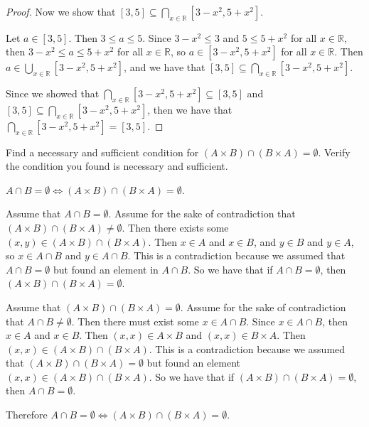 \documentclass[12 pt]{exam}
\begin{document}
\begin{questions}
\begin{solution}
\begin{proof}
    Now we show that $[3, 5] \subseteq \bigcap_{x \in \mathbb{R}} [3-x^2, 5+x^2]$.

    Let $a \in [3, 5]$. Then $3 \le a \le 5$. Since $3-x^2 \le 3$ and $5 \le 5+x^2$ for all
    $x \in \mathbb{R}$, then $3-x^2 \le a \le 5+x^2$ for all $x \in \mathbb{R}$, so
    $a \in [3-x^2, 5+x^2]$ for all $x \in \mathbb{R}$. Then $a \in \bigcup_{x \in \mathbb{R}} [3-x^2, 5+x^2]$,
    and we have that $[3, 5] \subseteq \bigcap_{x \in \mathbb{R}} [3-x^2, 5+x^2]$.

    Since we showed that $\bigcap_{x \in \mathbb{R}} [3-x^2, 5+x^2 ] \subseteq [3,5]$
    and $[3, 5] \subseteq \bigcap_{x \in \mathbb{R}} [3-x^2, 5+x^2]$, then we have that
    $\bigcap_{x \in \mathbb{R}} [3-x^2, 5+x^2 ] = [3,5]$.
\end{proof}\end{solution}


\question Find a necessary and sufficient condition for $(A \times B) \cap (B \times A) = \emptyset.$  Verify the condition you found is necessary and sufficient. 
\begin{solution}
    $A \cap B = \emptyset \iff (A \times B) \cap (B \times A) = \emptyset$.

    Assume that $A \cap B = \emptyset$. Assume for the sake of contradiction that
    $(A \times B) \cap (B \times A) \neq \emptyset$. Then there exists some
    $(x, y) \in (A \times B) \cap (B \times A)$. Then $x \in A$ and $x \in B$, and $y \in B$ and $y \in A$,
    so $x \in A \cap B$ and $y \in A \cap B$. This is a contradiction because we assumed that
    $A \cap B = \emptyset$ but found an element in $A \cap B$.
    So we have that if $A \cap B = \emptyset$, then $(A \times B) \cap (B \times A) = \emptyset$.

    Assume that $(A \times B) \cap (B \times A) = \emptyset$. Assume for the sake of contradiction that
    $A \cap B \ne \emptyset$. Then there must exist some $x \in A \cap B$.
    Since $x \in A \cap B$, then $x \in A$ and $x \in B$. Then $(x, x) \in A \times B$ and
    $(x,x) \in B \times A$. Then $(x, x) \in (A \times B) \cap (B \times A)$. This is a contradiction
    because we assumed that $(A \times B) \cap (B \times A) = \emptyset$ but found an element
    $(x,x) \in (A \times B) \cap (B \times A)$.
    So we have that if $(A \times B) \cap (B \times A) = \emptyset$, then $A \cap B = \emptyset$.

    Therefore $A \cap B = \emptyset \iff (A \times B) \cap (B \times A) = \emptyset$.
\end{solution}



\end{questions}
\end{document}
